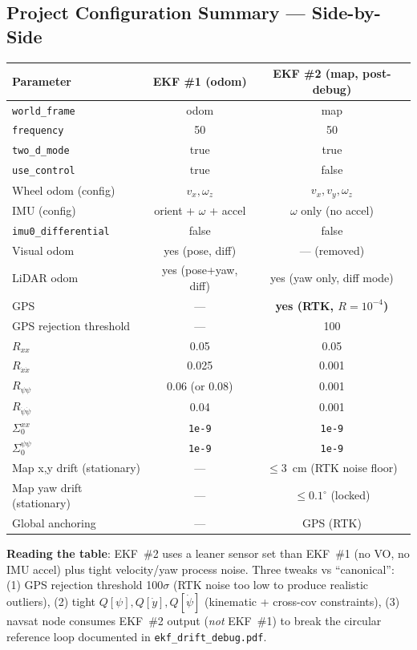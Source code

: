 \documentclass[11pt,a4paper]{article}
\begin{document}
\subsection{Project Configuration Summary --- Side-by-Side}

\begin{center}
\footnotesize
\begin{tabular}{p{4.0cm} c c}
\toprule
\textbf{Parameter} & \textbf{EKF \#1 (odom)} & \textbf{EKF \#2 (map, post-debug)} \\
\midrule
\texttt{world\_frame} & odom & map \\
\texttt{frequency} & 50 & 50 \\
\texttt{two\_d\_mode} & true & true \\
\texttt{use\_control} & true & false \\
Wheel odom (config) & $v_x, \omega_z$ & $v_x, v_y, \omega_z$ \\
IMU (config) & orient + $\omega$ + accel & $\omega$ only (no accel) \\
\texttt{imu0\_differential} & false & false \\
Visual odom & yes (pose, diff) & --- (removed) \\
LiDAR odom & yes (pose+yaw, diff) & yes (yaw only, diff mode) \\
GPS & --- & \textbf{yes (RTK, $R\!=\!10^{-4}$)} \\
GPS rejection threshold & --- & 100 \\
$R_{xx}$ & 0.05 & 0.05 \\
$R_{\dot{x}\dot{x}}$ & 0.025 & 0.001 \\
$R_{\psi\psi}$ & 0.06 (or 0.08) & 0.001 \\
$R_{\dot{\psi}\dot{\psi}}$ & 0.04 & 0.001 \\
$\Sigma_0^{xx}$ & \texttt{1e-9} & \texttt{1e-9} \\
$\Sigma_0^{\psi\psi}$ & \texttt{1e-9} & \texttt{1e-9} \\
\midrule
Map x,y drift (stationary) & --- & $\le 3$~cm (RTK noise floor) \\
Map yaw drift (stationary) & --- & $\le 0.1^\circ$ (locked) \\
Global anchoring & --- & GPS (RTK) \\
\bottomrule
\end{tabular}
\end{center}

\textbf{Reading the table}: EKF~\#2 uses a leaner sensor set than EKF~\#1 (no VO, no IMU accel) plus tight velocity/yaw process noise. Three tweaks vs ``canonical'': (1) GPS rejection threshold 100$\sigma$ (RTK noise too low to produce realistic outliers), (2) tight $Q[\psi], Q[\dot{y}], Q[\dot{\psi}]$ (kinematic + cross-cov constraints), (3) navsat node consumes EKF~\#2 output (\emph{not} EKF~\#1) to break the circular reference loop documented in \texttt{ekf\_drift\_debug.pdf}.
\end{document}

